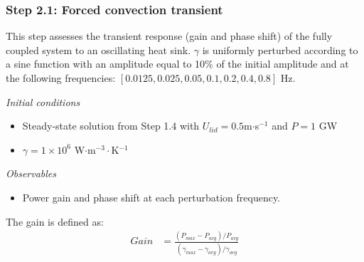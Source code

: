 \subsubsection{Step 2.1: Forced convection transient}

This step assesses the transient response (gain and phase shift) of the fully
coupled system to an oscillating heat sink. $\gamma$ is uniformly perturbed
according to a sine function with an amplitude equal to 10\% of the initial
amplitude and at the following frequencies: $[0.0125, 0.025, 0.05, 0.1, 0.2,
0.4, 0.8]$ Hz.

\textit{Initial conditions}
%
\begin{itemize}
    \item Steady-state solution from Step 1.4 with
    $U_{lid} = 0.5 $m$\cdot$s$^{-1}$ and $P = 1$ GW
    \item $\gamma = 1 \times 10^6$ W$\cdot$m$^{-3}\cdot$K$^{-1}$
\end{itemize}

\textit{Observables}
\begin{itemize}
    \item Power gain and phase shift at each perturbation frequency.
\end{itemize}
%
The gain is defined as:
%
\begin{align}
    Gain &= \frac{(P_{max} - P_{avg})/P_{avg}}{(\gamma_{max} - \gamma_{avg})/
    \gamma_{avg}}
\end{align}